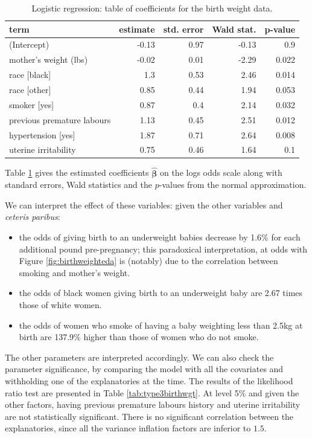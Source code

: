 \documentclass[
  11pt,
  letterpaper,
]{book}
\providecommand{\tightlist}{%
  \setlength{\itemsep}{0pt}\setlength{\parskip}{0pt}}
\theoremstyle{definition}
\theoremstyle{definition}
\theoremstyle{definition}
\theoremstyle{definition}
\theoremstyle{remark}
\begin{document}
\begin{table}

\caption{\label{tab:logistibirthwgt}Logistic regression: table of coefficients for the birth weight data.}
\centering
\begin{tabular}[t]{lrrrr}
\toprule
term & estimate & std. error & Wald stat. & p-value\\
\midrule
(Intercept) & -0.13 & 0.97 & -0.13 & 0.9\\
mother's weight (lbs) & -0.02 & 0.01 & -2.29 & 0.022\\
race [black] & 1.3 & 0.53 & 2.46 & 0.014\\
race [other] & 0.85 & 0.44 & 1.94 & 0.053\\
smoker [yes] & 0.87 & 0.4 & 2.14 & 0.032\\
\addlinespace
previous premature labours & 1.13 & 0.45 & 2.51 & 0.012\\
hypertension [yes] & 1.87 & 0.71 & 2.64 & 0.008\\
uterine irritability & 0.75 & 0.46 & 1.64 & 0.1\\
\bottomrule
\end{tabular}
\end{table}

Table \ref{tab:logistibirthwgt} gives the estimated coefficients \(\widehat{\boldsymbol{\beta}}\) on the logs odds scale along with standard errors, Wald statistics and the \(p\)-values from the normal approximation.

We can interpret the effect of these variables: given the other variables and \emph{ceteris paribus}:

\begin{itemize}
\tightlist
\item
  the odds of giving birth to an underweight babies decrease by 1.6\% for each additional pound pre-pregnancy; this paradoxical interpretation, at odds with Figure \ref{fig:birthweighteda} is (notably) due to the correlation between smoking and mother's weight.
\item
  the odds of black women giving birth to an underweight baby are 2.67 times those of white women.
\item
  the odds of women who smoke of having a baby weighting less than 2.5kg at birth are 137.9\% higher than those of women who do not smoke.
\end{itemize}

The other parameters are interpreted accordingly. We can also check the parameter significance, by comparing the model with all the covariates and withholding one of the explanatories at the time. The results of the likelihood ratio test are presented in Table \ref{tab:type3birthwgt}.
At level 5\% and given the other factors, having previous premature labours history and uterine irritability are not statistically significant. There is no significant correlation between the explanatories, since all the variance inflation factors are inferior to \(1.5\).
\end{document}
